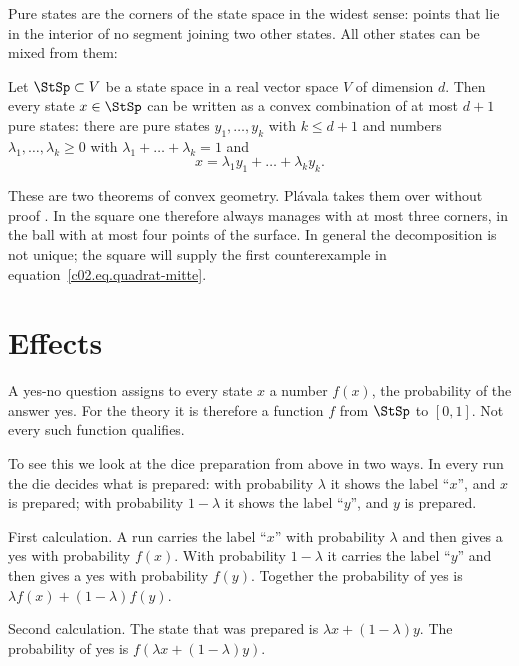 Pure states are the corners of the state space in the widest sense: points that lie in the
interior of no segment joining two other states. All other states can be mixed from them:

\begin{theorem}\label{c02.thm.zerlegung}
  Let $\StSp \subset V$ be a state space in a real vector space $V$ of dimension $d$.
  Then every state $x \in \StSp$ can be written as a convex combination of at most $d+1$
  pure states: there are pure states $y_1, \dots, y_k$ with $k \leq d+1$ and numbers
  $\lambda_1, \dots, \lambda_k \geq 0$ with $\lambda_1 + \dots + \lambda_k = 1$ and
  \begin{equation}\label{c02.eq.zerlegung}
    x = \lambda_1 y_1 + \dots + \lambda_k y_k .
  \end{equation}
\end{theorem}

These are two theorems of convex geometry. Plávala takes them over without proof
.
In the square one therefore always manages with at most three corners, in the ball with at
most four points of the surface. In general the decomposition is not unique; the square
will supply the first counterexample in equation~\eqref{c02.eq.quadrat-mitte}.

\section{Effects}\label{c02.s3}

A yes-no question assigns to every state $x$ a number $f(x)$, the probability of the
answer yes. For the theory it is therefore a function $f$ from $\StSp$ to $[0,1]$. Not
every such function qualifies.

To see this we look at the dice preparation from above in two ways. In every run the die
decides what is prepared: with probability $\lambda$ it shows the label “$x$”, and $x$ is
prepared; with probability $1-\lambda$ it shows the label “$y$”, and $y$ is prepared.

First calculation. A run carries the label “$x$” with probability $\lambda$ and then gives
a yes with probability $f(x)$. With probability $1-\lambda$ it carries the label “$y$” and
then gives a yes with probability $f(y)$. Together the probability of yes is
$\lambda f(x) + (1-\lambda) f(y)$.

Second calculation. The state that was prepared is $\lambda x + (1-\lambda) y$. The
probability of yes is $f(\lambda x + (1-\lambda) y)$.

